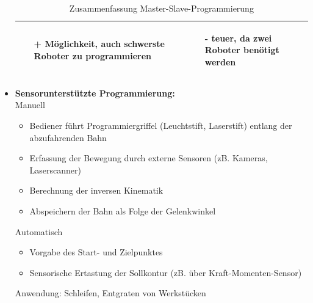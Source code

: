 \begin{itemize}
\begin{table}[hbt]
\begin{tabular}{|p{6.5cm}|p{6.5cm}|}
\begin{itemize}
\setlength\itemsep{0em}
\item[+] Möglichkeit, auch schwerste Roboter zu programmieren
\end{itemize}
 &
 \vspace{-5mm}
\begin{itemize}
\setlength\itemsep{0em}
\item[-] teuer, da zwei Roboter benötigt werden
\end{itemize}\\
\hline
\end{tabular}
\caption{Zusammenfassung Master-Slave-Programmierung}
\label{tab:MSprog}
\end{table}
\item \textbf{Sensorunterstützte Programmierung:}\\
Manuell
\begin{itemize}
\item Bediener führt Programmiergriffel (Leuchtstift, Laserstift) entlang der
abzufahrenden Bahn
\item Erfassung der Bewegung durch externe Sensoren (zB. Kameras,
Laserscanner)
\item Berechnung der inversen Kinematik
\item Abspeichern der Bahn als Folge der Gelenkwinkel
\end{itemize}
Automatisch
\begin{itemize}
\item Vorgabe des Start- und Zielpunktes
\item Sensorische Ertastung der Sollkontur (zB. über Kraft-Momenten-Sensor)
\end{itemize}
Anwendung: Schleifen, Entgraten von Werkstücken	
\end{itemize}
